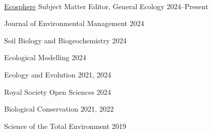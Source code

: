 \\



\begin{cventries}
  \cventry
    {\href{https://esajournals.onlinelibrary.wiley.com/journal/21508925}{Ecosphere}} %
    {Subject Matter Editor, General Ecology} %
    {2024--Present} %
    {} %
    {}
\end{cventries}


\begin{cvhonors}
  \mycvhonor
    {Journal of Environmental Management} %
    {} %
    {2024} %
    
  \mycvhonor
    {Soil Biology and Biogeochemistry} %
    {} %
    {2024} %

  \mycvhonor
    {Ecological Modelling} %
    {} %
    {2024} %

  \mycvhonor
    {Ecology and Evolution} %
    {} %
    {2021, 2024} %

  \mycvhonor
    {Royal Society Open Sciences} %
    {} %
    {2024} %

  \mycvhonor
    {Biological Conservation} %
    {} %
    {2021, 2022} %

  \mycvhonor
    {Science of the Total Environment} %
    {} %
    {2019} %
\end{cvhonors}

